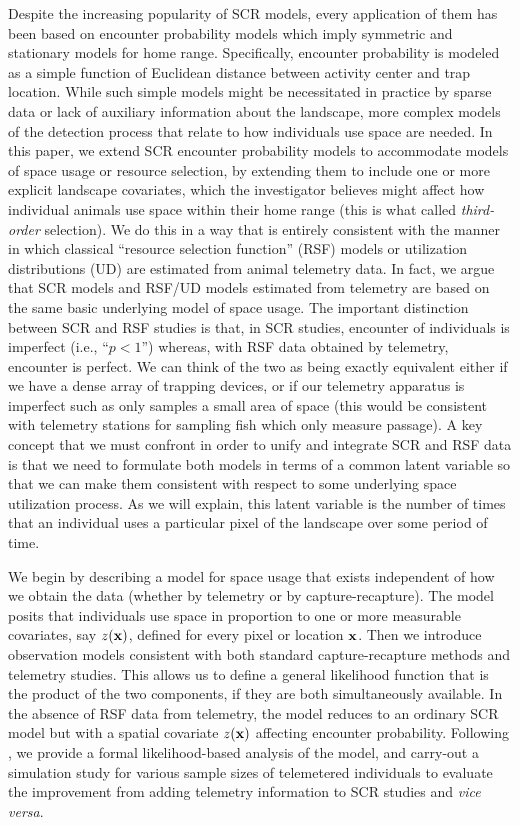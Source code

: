 \documentclass[12pt]{article}
\begin{document}
Despite the increasing popularity of SCR models, every 
application of them has been based on encounter probability
models which imply symmetric and stationary models for home
range. Specifically, encounter probability is modeled as a simple
function of Euclidean distance between activity center and trap
location.  While such simple models might be necessitated in practice
by sparse data or lack of auxiliary information about the landscape,
more complex models of the detection process
that relate to how individuals use space are needed. 
 In this paper,
we extend SCR encounter probability models to 
accommodate models of space usage or resource selection, by extending
them to include one or more explicit landscape covariates, which the
investigator believes might affect how individual animals use space
within their home range (this is what \citep{johnson:1980} called {\it
  third-order} selection). We do this in a way that is entirely
consistent with the manner in which classical ``resource selection
function'' (RSF) models \citep{manly_etal:2002} or utilization
distributions (UD) \citep{worton:1989, fieberg:2005, fieberg:2007} are
estimated from animal telemetry data.  In fact, we argue that SCR
models and RSF/UD models estimated from telemetry are based on the
same basic underlying model of space usage. The important distinction
between SCR and RSF studies is that, in SCR studies, encounter of
individuals is imperfect (i.e., ``$p<1$'') whereas, with RSF data
obtained by telemetry, encounter is perfect.  We can think of the two
as being exactly equivalent either if we have a dense array of
trapping devices, or if our telemetry apparatus is imperfect such as
only samples a small area of space (this would be consistent with
telemetry stations for sampling fish which only measure passage).  A
key concept that we must confront in order to unify and integrate SCR
and RSF data is that we need to formulate both models in terms of a
common latent variable so that we can make them consistent with
respect to some underlying space utilization process. As we will
explain, this latent variable is the number of times that an
individual uses a particular pixel of the landscape over some period
of time.

We begin by describing a model for space usage that exists independent
of how we obtain the data (whether by telemetry or by
capture-recapture). The model posits that individuals use space in
proportion to one or more measurable covariates, say $z({\bf x})$,
defined for every pixel or location ${\bf x}$.  Then we introduce
observation models consistent with both standard capture-recapture
methods and telemetry studies.  This allows us to define a general
likelihood function that is the product of the two components, if they
are both simultaneously available.  In the absence of RSF data from
telemetry, the model reduces to an ordinary SCR model but with a
spatial covariate $z({\bf x})$ affecting encounter probability.  
Following \citet{borchers_efford:2008}, we provide a formal
likelihood-based analysis of the model, and carry-out a simulation
study for various sample sizes of telemetered individuals to evaluate
the improvement from adding telemetry information to SCR studies and
{\it vice versa}.
\end{document}
